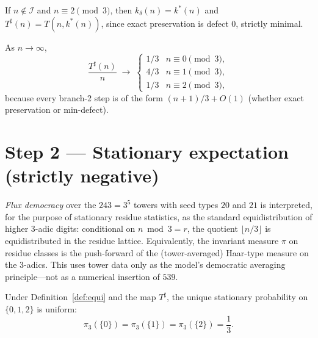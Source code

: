 \begin{lemma}
\label{lem:agree-feas}
If \(n\notin\mathcal{I}\) and \(n\equiv 2\pmod{3}\), then \(k_\delta(n)=k^\ast(n)\)
and \(T^\sharp(n)=T(n,k^\ast(n))\), since exact preservation is defect \(0\),
strictly minimal.
\end{lemma}

\begin{lemma}
\label{lem:asymp}
As \(n\to\infty\),
\begin{equation}
\label{eq:asymp}
\frac{T^\sharp(n)}{n}
\;\longrightarrow\;
\begin{cases}
1/3 & n\equiv 0\pmod{3},\\
4/3 & n\equiv 1\pmod{3},\\
1/3 & n\equiv 2\pmod{3},
\end{cases}
\end{equation}
because every branch-2 step is of the form \((n+1)/3+O(1)\) (whether exact
preservation or min-defect).
\end{lemma}

\section{Step 2 --- Stationary expectation (strictly negative)}
\label{sec:stationary}

\begin{definition}
\label{def:equi}
\emph{Flux democracy} over the \(243=3^5\) towers with seed types \(20\) and
\(21\) is interpreted, for the purpose of stationary residue statistics, as
the standard equidistribution of higher \(3\)-adic digits: conditional on
\(n\bmod 3=r\), the quotient \(\lfloor n/3\rfloor\) is equidistributed in the
residue lattice. Equivalently, the invariant measure \(\pi\) on residue classes
is the push-forward of the (tower-averaged) Haar-type measure on the \(3\)-adics.
This uses tower data only as the model's democratic averaging principle---not
as a numerical insertion of \(539\).
\end{definition}

\begin{lemma}
\label{lem:unif3}
Under Definition~\ref{def:equi} and the map \(T^\sharp\), the unique stationary
probability on \(\{0,1,2\}\) is uniform:
\[
\pi_3(\{0\})=\pi_3(\{1\})=\pi_3(\{2\})=\frac13.
\]
\end{lemma}

